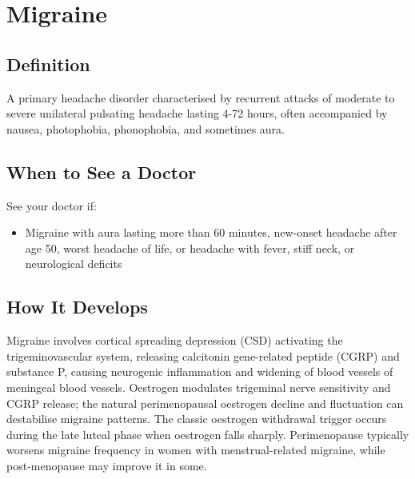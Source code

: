\chapter{Migraine}

\section*{Definition}
A primary headache disorder characterised by recurrent attacks of moderate to severe unilateral pulsating headache lasting 4-72 hours, often accompanied by nausea, photophobia, phonophobia, and sometimes aura.

\section*{When to See a Doctor}
See your doctor if:
\begin{itemize}
  \item Migraine with aura lasting more than 60 minutes, new-onset headache after age 50, worst headache of life, or headache with fever, stiff neck, or neurological deficits
\end{itemize}

\section*{How It Develops}
Migraine involves cortical spreading depression (CSD) activating the trigeminovascular system, releasing calcitonin gene-related peptide (CGRP) and substance P, causing neurogenic inflammation and widening of blood vessels of meningeal blood vessels. Oestrogen modulates trigeminal nerve sensitivity and CGRP release; the natural perimenopausal oestrogen decline and fluctuation can destabilise migraine patterns. The classic oestrogen withdrawal trigger occurs during the late luteal phase when oestrogen falls sharply. Perimenopause typically worsens migraine frequency in women with menstrual-related migraine, while post-menopause may improve it in some.

